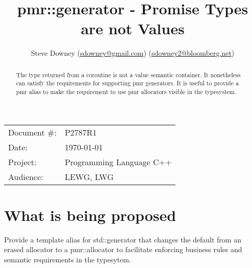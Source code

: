 \documentclass[a4paper,10pt,oneside,openany,final,article]{memoir}
\begin{document}
\title{pmr::generator - Promise Types are not Values}
\author{
  Steve Downey \small(\href{mailto:sdowney@gmail.com}{sdowney@gmail.com}) \small(\href{mailto:sdowney2@bloomberg.net}{sdowney2@bloomberg.net}) \\
}
\date{} %
\maketitle

\begin{flushright}
\begin{tabular}{ll}
Document \#: & P2787R1 \\
Date: & \today \\
Project: & Programming Language C++ \\
Audience: & LEWG, LWG
\end{tabular}
\end{flushright}

\begin{abstract}
  The type returned from a coroutine is not a value semantic container.
  It nonetheless can satisfy the requirements for supporting pmr generators.
  It is useful to provide a pmr alias to make the requirement to use pmr allocators visible in the typesystem.
\end{abstract}

\tableofcontents*

\chapter{What is being proposed}
Provide a template alias for std::generator that changes the default from an erased allocator to a pmr::allocator to facilitate enforcing business rules and semantic requirements in the typesytem.
\end{document}
